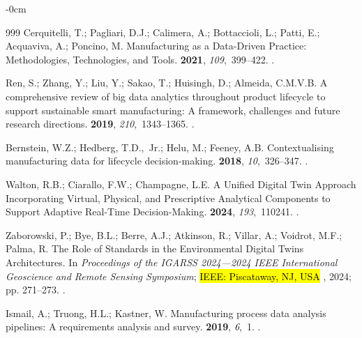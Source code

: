 \documentclass[systems,article,accept,pdftex,moreauthors]{Definitions/mdpi}
\begin{document}
\begin{adjustwidth}{-\extralength}{0cm}
\begin{thebibliography}{999}
Cerquitelli, T.; Pagliari, D.J.; Calimera, A.; Bottaccioli, L.; Patti, E.;
  Acquaviva, A.; Poncino, M.
\newblock Manufacturing as a Data-Driven Practice: Methodologies, Technologies,
  and Tools.
 {\bf 2021}, {\em 109},~399--422.
.

Ren, S.; Zhang, Y.; Liu, Y.; Sakao, T.; Huisingh, D.; Almeida, C.M.V.B.
\newblock A comprehensive review of big data analytics throughout product
  lifecycle to support sustainable smart manufacturing: A framework, challenges
  and future research directions.
 {\bf 2019}, {\em 210},~1343--1365.
.

Bernstein, W.Z.; Hedberg, T.D.,~Jr.; Helu, M.; Feeney, A.B.
\newblock Contextualising manufacturing data for lifecycle decision-making.
 {\bf 2018}, {\em 10},~326--347.
.

Walton, R.B.; Ciarallo, F.W.; Champagne, L.E.
\newblock A Unified Digital Twin Approach Incorporating Virtual, Physical, and
  Prescriptive Analytical Components to Support Adaptive Real-Time
  Decision-Making.
 {\bf 2024}, {\em
  193},~110241.
.

Zaborowski, P.; Bye, B.L.; Berre, A.J.; Atkinson, R.; Villar, A.; Voidrot,
  M.F.; Palma, R.
\newblock The Role of Standards in the Environmental Digital Twins
  Architectures.
\newblock In \textit{Proceedings of the IGARSS 2024---2024 IEEE International
  Geoscience and Remote Sensing Symposium}; \hl{IEEE: Piscataway, NJ, USA}%
, 2024; pp. 271--273.
.

Ismail, A.; Truong, H.L.; Kastner, W.
\newblock Manufacturing process data analysis pipelines: A requirements
  analysis and survey.
 {\bf 2019}, {\em 6},~1.
.


\end{thebibliography}
\end{adjustwidth}
\end{document}
